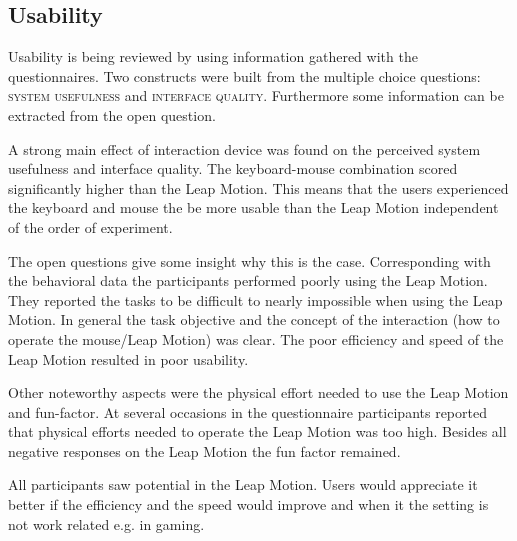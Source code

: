 \subsection{Usability}
Usability is being reviewed by using information gathered with the questionnaires. Two constructs were built from the multiple choice questions: \textsc{system usefulness} 
and \textsc{interface quality}. Furthermore some information can be extracted from the open question. 

A strong main effect of interaction device was found on the perceived system usefulness and interface quality. The keyboard-mouse combination scored significantly higher than 
the Leap Motion. This means that the users experienced the keyboard and mouse the be more usable than the Leap Motion independent of the order of experiment. 

The open questions give some insight why this is the case. Corresponding with the behavioral data the participants performed poorly using the Leap Motion. They reported the 
tasks to be difficult to nearly impossible when using the Leap Motion. In general the task objective and the concept of the interaction (how to operate the mouse/Leap Motion) 
was clear. The poor efficiency and speed of the Leap Motion resulted in poor usability. 

Other noteworthy aspects were the physical effort needed to use the Leap Motion and fun-factor. At several occasions in the questionnaire participants reported that physical 
efforts needed to operate the Leap Motion was too high. Besides all negative responses on the Leap Motion the fun factor remained.

All participants saw potential in the Leap Motion. Users would appreciate it better if the efficiency and the speed would improve and when it the setting is not work 
related e.g. in gaming. 
